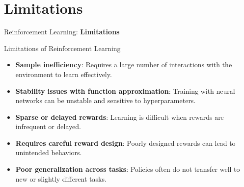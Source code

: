 \section{Limitations}
\begin{frame}{}
    \LARGE Reinforcement Learning: \textbf{Limitations}
\end{frame}

\begin{frame}{Limitations of Reinforcement Learning}
    \begin{itemize}
        \item \textbf{Sample inefficiency}: Requires a large number of interactions with the environment to learn effectively.
        \item \textbf{Stability issues with function approximation}: Training with neural networks can be unstable and sensitive to hyperparameters.
        \item \textbf{Sparse or delayed rewards}: Learning is difficult when rewards are infrequent or delayed.
        \item \textbf{Requires careful reward design}: Poorly designed rewards can lead to unintended behaviors.
        \item \textbf{Poor generalization across tasks}: Policies often do not transfer well to new or slightly different tasks.
    \end{itemize}
\end{frame}